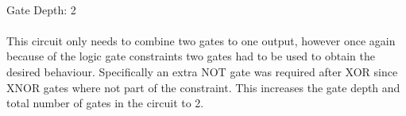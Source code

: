 \documentclass{article}
\begin{document}
\begin{enumerate}
        \\ Gate Depth: 2 \\ \\ This circuit only needs to combine two gates to one output, however once again because of the logic gate constraints two gates had to be used to obtain the desired behaviour.
        Specifically an extra NOT gate was required after XOR since XNOR gates where not part of the constraint.
        This increases the gate depth and total number of gates in the circuit to 2. \\ \\
    \end{enumerate}
\end{document}
